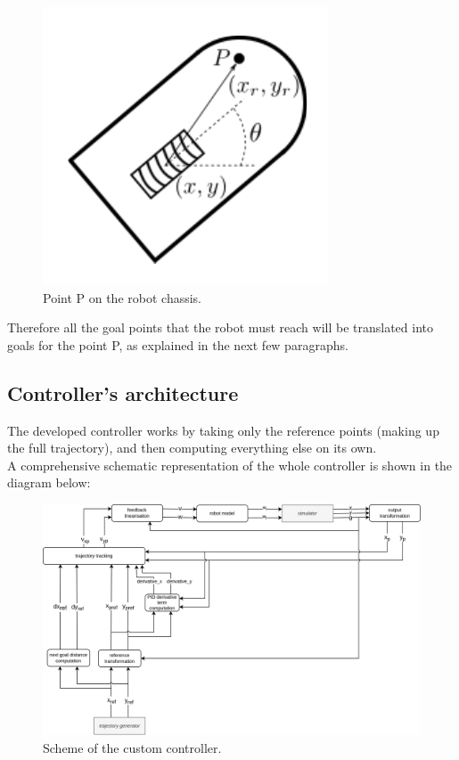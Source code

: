 \documentclass[11pt,a4paper]{article}
\begin{document}
\begin{figure}[H]
    \centering
    \includegraphics[scale=0.5]{other/point_p.png}
    \caption{Point P on the robot chassis.}
\end{figure}

Therefore all the goal points that the robot must reach will be translated into goals for the point P,
as explained in the next few paragraphs.



\subsection{Controller's architecture}

The developed controller works by taking only the reference points (making up the full trajectory),
and then computing everything else on its own.\\

A comprehensive schematic representation of the whole controller is shown in the diagram below:\\

\begin{figure}[H]
    \centering
    \includegraphics[scale=0.17]{other/custom_controller.png}
    \caption{Scheme of the custom controller.}
\end{figure}
\end{document}
